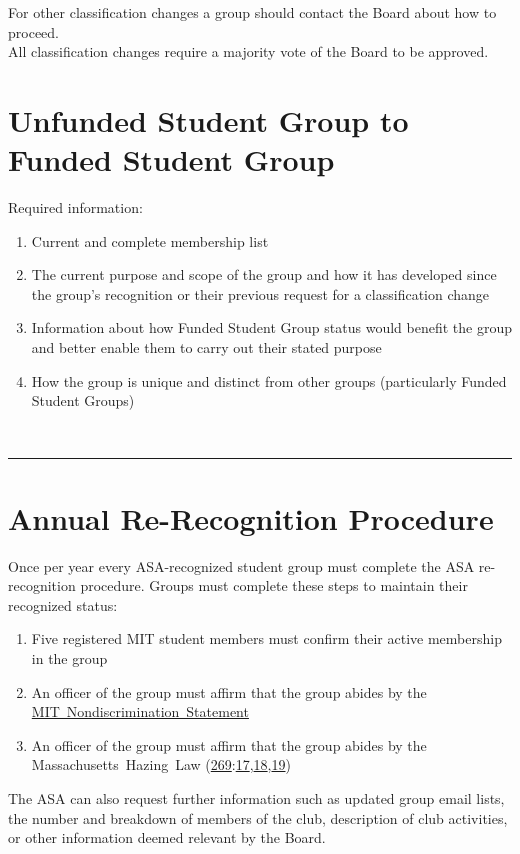 \documentclass[12pt]{article}
\newcommand{\MHL}{%
    Massachusetts~Hazing~Law (\href{https://malegislature.gov/Laws/GeneralLaws/PartIV/TitleI/Chapter269}{269}:\href{https://malegislature.gov/Laws/GeneralLaws/PartIV/TitleI/Chapter269/Section17}{17},\href{https://malegislature.gov/Laws/GeneralLaws/PartIV/TitleI/Chapter269/Section18}{18},\href{https://malegislature.gov/Laws/GeneralLaws/PartIV/TitleI/Chapter269/Section19}{19})\xspace
}
\newcommand{\NDS}{\href{https://handbook.mit.edu/nondiscrimination}{MIT~Nondiscrimination~Statement}\xspace}
\begin{document}
For other classification changes a group should contact the Board about how to proceed.
\\

All classification changes require a majority vote of the Board to be approved.


\section{Unfunded Student Group to Funded Student Group}
\label{app:B_artVI_sect1}
Required information:
\begin{enumerate}
    \item Current and complete membership list
    \item The current purpose and scope of the group and how it has developed since the group’s
recognition or their previous request for a classification change
    \item Information about how Funded Student Group status would benefit the group and better
enable them to carry out their stated purpose
    \item How the group is unique and distinct from other groups (particularly Funded Student Groups)
\end{enumerate}
\,\hrule
\vspace*{1em}



\section{Annual Re-Recognition Procedure}
Once per year every ASA-recognized student group must complete the ASA re-recognition procedure.
Groups must complete these steps to maintain their recognized status:
\begin{enumerate}
    \item Five registered MIT student members must confirm their active membership in the group
    \item An officer of the group must affirm that the group abides by the \NDS
    \item An officer of the group must affirm that the group abides by the \MHL
\end{enumerate}
The ASA can also request further information such as updated group email lists, the number and
breakdown of members of the club, description of club activities, or other information deemed relevant
by the Board.
\\
\end{document}
